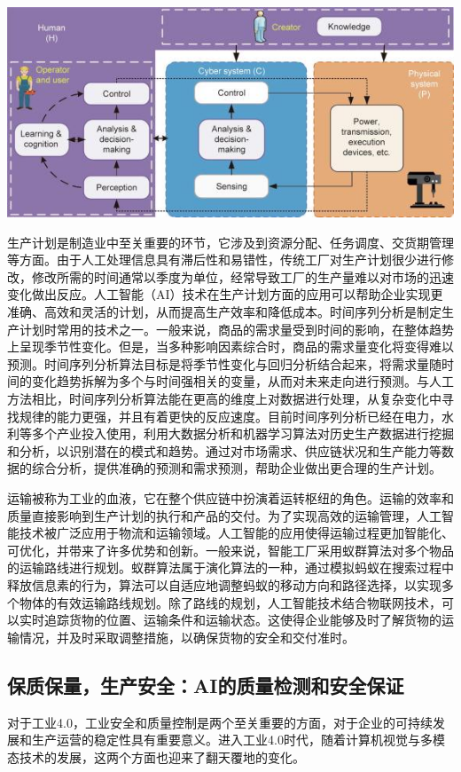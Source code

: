 \begin{marginfigure}
    \includegraphics{images/industry_5.jpg}
\end{marginfigure}

生产计划是制造业中至关重要的环节，它涉及到资源分配、任务调度、交货期管理等方面。由于人工处理信息具有滞后性和易错性，传统工厂对生产计划很少进行修改，修改所需的时间通常以季度为单位，经常导致工厂的生产量难以对市场的迅速变化做出反应。人工智能（AI）技术在生产计划方面的应用可以帮助企业实现更准确、高效和灵活的计划，从而提高生产效率和降低成本。时间序列分析是制定生产计划时常用的技术之一。一般来说，商品的需求量受到时间的影响，在整体趋势上呈现季节性变化。但是，当多种影响因素综合时，商品的需求量变化将变得难以预测。时间序列分析算法目标是将季节性变化与回归分析结合起来，将需求量随时间的变化趋势拆解为多个与时间强相关的变量，从而对未来走向进行预测。与人工方法相比，时间序列分析算法能在更高的维度上对数据进行处理，从复杂变化中寻找规律的能力更强，并且有着更快的反应速度。目前时间序列分析已经在电力，水利等多个产业投入使用，利用大数据分析和机器学习算法对历史生产数据进行挖掘和分析，以识别潜在的模式和趋势。通过对市场需求、供应链状况和生产能力等数据的综合分析，提供准确的预测和需求预测，帮助企业做出更合理的生产计划。

运输被称为工业的血液，它在整个供应链中扮演着运转枢纽的角色。运输的效率和质量直接影响到生产计划的执行和产品的交付。为了实现高效的运输管理，人工智能技术被广泛应用于物流和运输领域。人工智能的应用使得运输过程更加智能化、可优化，并带来了许多优势和创新。一般来说，智能工厂采用蚁群算法对多个物品的运输路线进行规划。蚁群算法属于演化算法的一种，通过模拟蚂蚁在搜索过程中释放信息素的行为，算法可以自适应地调整蚂蚁的移动方向和路径选择，以实现多个物体的有效运输路线规划。除了路线的规划，人工智能技术结合物联网技术，可以实时追踪货物的位置、运输条件和运输状态。这使得企业能够及时了解货物的运输情况，并及时采取调整措施，以确保货物的安全和交付准时。

\subsection{保质保量，生产安全：AI的质量检测和安全保证}
对于工业4.0，工业安全和质量控制是两个至关重要的方面，对于企业的可持续发展和生产运营的稳定性具有重要意义。进入工业4.0时代，随着计算机视觉与多模态技术的发展，这两个方面也迎来了翻天覆地的变化。

